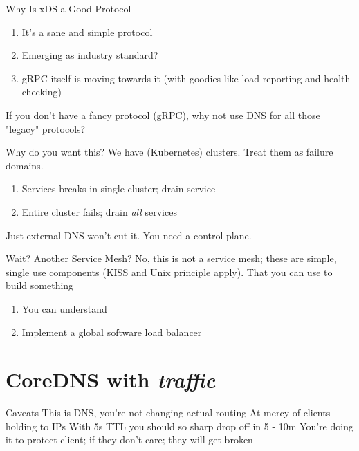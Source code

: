 \documentclass[aspectratio=169]{beamer}
\begin{document}
    \begin{frame}{Why Is xDS a Good Protocol}
        \begin{enumerate}
            \item It's a sane and simple protocol
            \item Emerging as industry standard?
            \item gRPC itself is moving towards it (with goodies like load reporting and health checking)
        \end{enumerate}
        If you don't have a fancy protocol (gRPC), why not use DNS for all those "legacy" protocols?
    \end{frame}

    \begin{frame}{Why do you want this?}
        We have (Kubernetes) clusters. Treat them as failure domains.
        \begin{enumerate}
            \item Services breaks in single cluster; drain service
            \item Entire cluster fails; drain \emph{all} services
        \end{enumerate}
        Just external DNS won't cut it. You need a control plane.
    \end{frame}

    \begin{frame}{Wait? Another Service Mesh?}
        No, this is not a service mesh; these are simple, single use components (KISS and Unix principle apply). That you can use
        to build something
        \begin{enumerate}
            \item You can understand
            \item Implement a global software load balancer
        \end{enumerate}
    \end{frame}


    \section{CoreDNS with \emph{traffic}}

    \begin{frame}{Caveats}
        This is DNS, you're not changing actual routing
        At mercy of clients holding to IPs
        With 5s TTL you should so sharp drop off in 5 - 10m You're doing it to protect client; if they don't care; they will get broken
    \end{frame}
\end{document}
